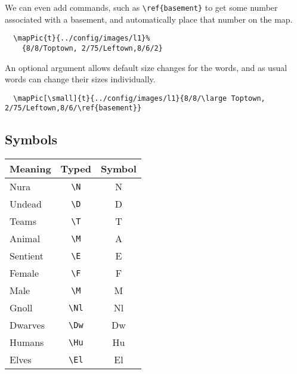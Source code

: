\documentclass[a4paper,openany]{book}
\begin{document}
\begin{multicols}{2}
We can even add commands, such as \verb"\ref{basement}" to get some number associated with a basement, and automatically place that number on the map.

\begin{verbatim}
  \mapPic{t}{../config/images/l1}%
    {8/8/Toptown, 2/75/Leftown,8/6/2}
\end{verbatim}

An optional argument allows default size changes for the words, and as usual words can change their sizes individually.

\begin{verbatim}
  \mapPic[\small]{t}{../config/images/l1}{8/8/\large Toptown, 2/75/Leftown,8/6/\ref{basement}}
\end{verbatim}

\subsection{Symbols}

\begin{tabularx}{\linewidth}{Xcc}

  Meaning & Typed & Symbol \\\hline

  Nura & {\tt \textbackslash{N}} & \gls{N} \\

  Undead & {\tt \textbackslash{D}} & \gls{D} \\
  \hline
  Teams & {\tt \textbackslash{T}} & \gls{T} \\

  Animal & {\tt \textbackslash{M}} & \gls{A} \\

  Sentient & {\tt \textbackslash{E}} & \gls{E} \\

  Female & {\tt \textbackslash{F}} & \gls{F} \\

  Male & {\tt \textbackslash{M}} & \gls{M} \\

  \hline
  Gnoll & {\tt \textbackslash{Nl}} & \gls{Nl} \\

  Dwarves & {\tt \textbackslash{Dw}} & \gls{Dw} \\

  Humans & {\tt \textbackslash{Hu}} & \gls{Hu} \\

  Elves & {\tt \textbackslash{El}} & \gls{El} \\


\end{tabularx}
\end{multicols}
\end{document}
